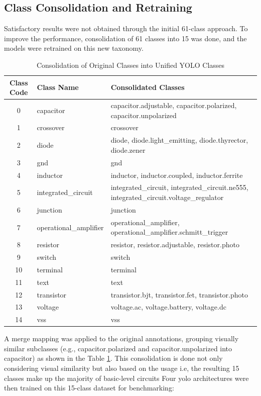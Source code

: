 \subsection{Class Consolidation and Retraining}

Satisfactory results were not obtained through the initial 61-class approach. To improve the performance, consolidation of 61 classes into 15 was done, and the models were retrained on this new taxonomy. 

\begin{table}[H]
\centering
\caption{Consolidation of Original Classes into Unified YOLO Classes}
\label{tab:class_consolidation}
\begin{tabular}{@{}clp{8.2cm}@{}}
\toprule
\textbf{Class Code} & \textbf{Class Name} & \textbf{Consolidated Classes} \\
\midrule
0  & capacitor & capacitor.adjustable, capacitor.polarized, capacitor.unpolarized \\
1  & crossover & crossover \\
2  & diode & diode, diode.light\_emitting, diode.thyrector, diode.zener \\
3  & gnd & gnd \\
4  & inductor & inductor, inductor.coupled, inductor.ferrite \\
5  & integrated\_circuit & integrated\_circuit, integrated\_circuit.ne555, integrated\_circuit.voltage\_regulator \\
6  & junction & junction \\
7  & operational\_amplifier & operational\_amplifier, operational\_amplifier.schmitt\_trigger \\
8  & resistor & resistor, resistor.adjustable, resistor.photo \\
9  & switch & switch \\
10 & terminal & terminal \\
11 & text & text \\
12 & transistor & transistor.bjt, transistor.fet, transistor.photo \\
13 & voltage & voltage.ac, voltage.battery, voltage.dc \\
14 & vss & vss \\
\bottomrule
\end{tabular}
\end{table}

A merge mapping was applied to the original annotations, grouping visually similar subclasses (e.g., capacitor.polarized and capacitor.unpolarized into capacitor) as shown in the Table \ref{tab:class_consolidation}. This consolidation is done not only considering visual similarity but also based on the usage i.e, the resulting 15 classes make up the majority of basic-level circuits Four \gls{yolo} architectures were then trained on this 15-class dataset for benchmarking:


